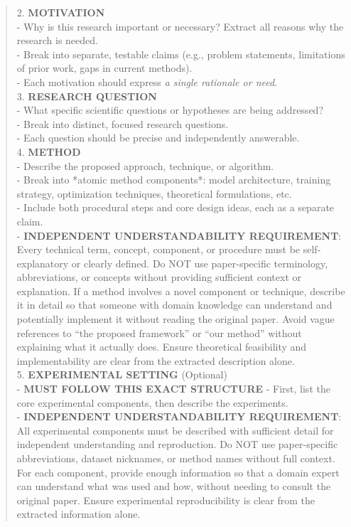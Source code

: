 \begin{quote}
\begin{tcolorbox}[breakable,colback=extraction!20!white, colframe=extraction!60!black, title=\textbf{Prompt for Extraction Agent}]
        2. \textbf{MOTIVATION}\\
        - Why is this research important or necessary? Extract all reasons why the research is needed.\\
        - Break into separate, testable claims (e.g., problem statements, limitations of prior work, gaps in current methods).\\
        - Each motivation should express \textit{a single rationale or need}.\\

        3. \textbf{RESEARCH QUESTION}\\
        - What specific scientific questions or hypotheses are being addressed?\\
        - Break into distinct, focused research questions.\\
        - Each question should be precise and independently answerable.\\

        4. \textbf{METHOD}\\
        - Describe the proposed approach, technique, or algorithm.\\
        - Break into *atomic method components*: model architecture, training strategy, optimization techniques, theoretical formulations, etc.\\
        - Include both procedural steps and core design ideas, each as a separate claim.\\
        - \textbf{INDEPENDENT UNDERSTANDABILITY REQUIREMENT}: Every technical term, concept, component, or procedure must be self-explanatory or clearly defined. Do NOT use paper-specific terminology, abbreviations, or concepts without providing sufficient context or explanation. If a method involves a novel component or technique, describe it in detail so that someone with domain knowledge can understand and potentially implement it without reading the original paper. Avoid vague references to ``the proposed framework'' or ``our method'' without explaining what it actually does. Ensure theoretical feasibility and implementability are clear from the extracted description alone.\\

        5. \textbf{EXPERIMENTAL SETTING} (Optional)\\
        - \textbf{MUST FOLLOW THIS EXACT STRUCTURE} - First, list the core experimental components, then describe the experiments.\\
        - \textbf{INDEPENDENT UNDERSTANDABILITY REQUIREMENT}: All experimental components must be described with sufficient detail for independent understanding and reproduction. Do NOT use paper-specific abbreviations, dataset nicknames, or method names without full context. For each component, provide enough information so that a domain expert can understand what was used and how, without needing to consult the original paper. Ensure experimental reproducibility is clear from the extracted information alone.\\
        

\end{tcolorbox}
\end{quote}

